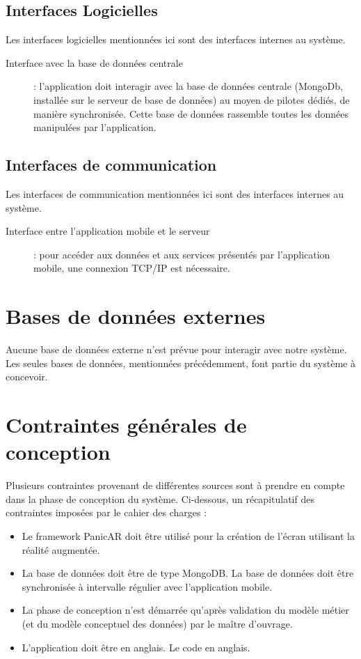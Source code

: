 \documentclass[a4paper,12pt]{report}
\begin{document}
\begin{onehalfspace}
\section{Interfaces Logicielles}
Les interfaces logicielles mentionnées ici sont des interfaces internes au système.

\begin{description}
  \item[Interface avec la base de données centrale]: l'application doit interagir avec la base de données centrale (MongoDb, installée sur le serveur de base de données) au moyen de pilotes dédiés, de manière synchronisée. Cette base de données rassemble toutes les données manipulées par l'application.

\end{description}

\section{Interfaces de communication}
  Les interfaces de communication mentionnées ici sont des interfaces internes au système.

  \begin{description}
    \item[Interface entre l'application mobile et le serveur]: pour accéder aux données et aux services présentés par l'application mobile, une connexion TCP/IP est nécessaire.
  \end{description}

\chapter{Bases de données externes}
  Aucune base de données externe n'est prévue pour interagir avec notre système. Les seules bases de données, mentionnées précédemment, font partie du système à concevoir.

\chapter{Contraintes générales de conception}
  Plusieurs contraintes provenant de différentes sources sont à prendre en compte dans la phase de conception du système. Ci-dessous, un récapitulatif des contraintes imposées par le cahier des charges :

\begin{itemize}
  \item Le framework PanicAR doit être utilisé pour la création de l'écran utilisant la réalité augmentée.
  \item La base de données doit être de type MongoDB. La base de données doit être synchronisée à intervalle régulier avec l'application mobile.
  \item La phase de conception n'est démarrée qu'après validation du modèle métier (et du modèle conceptuel des données) par le maître d'ouvrage.
  \item L'application doit être en anglais. Le code en anglais.
\end{itemize}


\end{onehalfspace}
\end{document}
